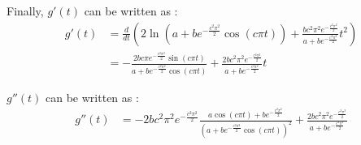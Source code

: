 \documentclass[letterpaper]{article}
\begin{document}
Finally, $g'(t)$ can be written as :
\begin{align*}
    g'(t) &= \frac{d}{dt}\left(2\ln(a + be^{-\frac{c^{2}\pi^{2}}{2}}\cos(c\pi t)) + \frac{bc^{2}\pi^{2}e^{-\frac{c^{2}\pi^{2}}{2}}}{a + be^{-\frac{c^{2}\pi^{2}}{2}}}t^2\right) \\
    &= -\frac{2bc\pi e^{-\frac{c^{2}\pi^{2}}{2}} \sin(c\pi t)}{a + be^{-\frac{c^{2}\pi^{2}}{2}}\cos(c\pi t)} + \frac{2bc^{2}\pi^{2}e^{-\frac{c^{2}\pi^{2}}{2}}}{a + be^{-\frac{c^{2}\pi^{2}}{2}}}t
\end{align*}

$g''(t)$ can be written as : 
\begin{align*}
    g''(t) %
    &= -2bc^{2}\pi^{2} e^{-\frac{c^{2}\pi^{2}}{2}}\frac{a \cos(c\pi t) +  b e^{-\frac{c^{2}\pi^{2}}{2}}}{(a + be^{-\frac{c^{2}\pi^{2}}{2}}\cos(c\pi t))^{2}} + \frac{2bc^{2}\pi^{2}e^{-\frac{c^{2}\pi^{2}}{2}}}{a + be^{-\frac{c^{2}\pi^{2}}{2}}}
\end{align*}
\end{document}
